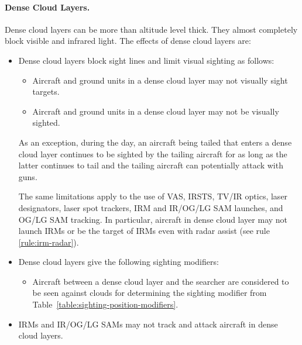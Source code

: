 \begin{advancedrules}
{\begin{itemize}
\end{itemize}

\paragraph{Dense Cloud Layers.}
\label{rule:dense-cloud-layers}
Dense cloud layers can be more than altitude level thick. They almost completely block visible and infrared light. The effects of dense cloud layers are:

\begin{itemize}

\item{} Dense cloud layers block sight lines and limit visual sighting as follows:

\begin{itemize}
\item
Aircraft and ground units in a dense cloud layer may not visually sight targets.

\item 
Aircraft and ground units in a dense cloud layer may not be visually sighted.
\end{itemize}

As an exception, during the day, an aircraft being tailed that enters a dense cloud layer continues to be sighted by the tailing aircraft for as long as the latter continues to tail and the tailing aircraft can potentially attack with guns.

The same limitations apply to the use of VAS, IRSTS, TV/IR optics, laser designators, laser spot trackers, IRM and IR/OG/LG SAM launches, and OG/LG SAM tracking. In particular, aircraft in dense cloud layer may not launch IRMs or be the target of IRMs even with radar assist (see rule \ref{rule:irm-radar}).

\item{} Dense cloud layers give the following sighting modifiers:
\begin{itemize}

\item Aircraft between a dense cloud layer and the searcher are considered to be seen against clouds for determining the sighting modifier from Table~\ref{table:sighting-position-modifiers}.

\end{itemize}

\item{} IRMs and IR/OG/LG SAMs may not track and attack aircraft in dense cloud layers. 


\end{itemize}}
\end{advancedrules}
